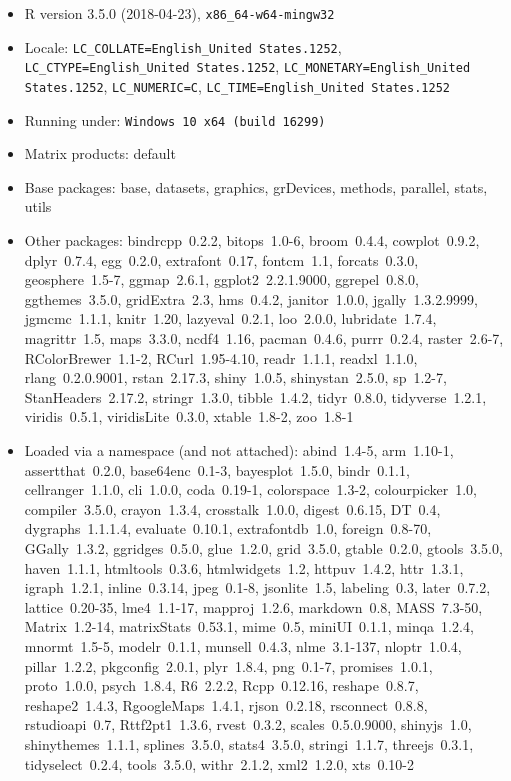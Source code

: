 \documentclass[draft]{agujournal}\usepackage{knitr}
\begin{document}
\begin{itemize}\raggedright
  \item R version 3.5.0 (2018-04-23), \verb|x86_64-w64-mingw32|
  \item Locale: \verb|LC_COLLATE=English_United States.1252|, \verb|LC_CTYPE=English_United States.1252|, \verb|LC_MONETARY=English_United States.1252|, \verb|LC_NUMERIC=C|, \verb|LC_TIME=English_United States.1252|
  \item Running under: \verb|Windows 10 x64 (build 16299)|
  \item Matrix products: default
  \item Base packages: base, datasets, graphics, grDevices,
    methods, parallel, stats, utils
  \item Other packages: bindrcpp~0.2.2, bitops~1.0-6, broom~0.4.4,
    cowplot~0.9.2, dplyr~0.7.4, egg~0.2.0, extrafont~0.17,
    fontcm~1.1, forcats~0.3.0, geosphere~1.5-7, ggmap~2.6.1,
    ggplot2~2.2.1.9000, ggrepel~0.8.0, ggthemes~3.5.0,
    gridExtra~2.3, hms~0.4.2, janitor~1.0.0, jgally~1.3.2.9999,
    jgmcmc~1.1.1, knitr~1.20, lazyeval~0.2.1, loo~2.0.0,
    lubridate~1.7.4, magrittr~1.5, maps~3.3.0, ncdf4~1.16,
    pacman~0.4.6, purrr~0.2.4, raster~2.6-7, RColorBrewer~1.1-2,
    RCurl~1.95-4.10, readr~1.1.1, readxl~1.1.0, rlang~0.2.0.9001,
    rstan~2.17.3, shiny~1.0.5, shinystan~2.5.0, sp~1.2-7,
    StanHeaders~2.17.2, stringr~1.3.0, tibble~1.4.2, tidyr~0.8.0,
    tidyverse~1.2.1, viridis~0.5.1, viridisLite~0.3.0,
    xtable~1.8-2, zoo~1.8-1
  \item Loaded via a namespace (and not attached): abind~1.4-5,
    arm~1.10-1, assertthat~0.2.0, base64enc~0.1-3,
    bayesplot~1.5.0, bindr~0.1.1, cellranger~1.1.0, cli~1.0.0,
    coda~0.19-1, colorspace~1.3-2, colourpicker~1.0,
    compiler~3.5.0, crayon~1.3.4, crosstalk~1.0.0, digest~0.6.15,
    DT~0.4, dygraphs~1.1.1.4, evaluate~0.10.1, extrafontdb~1.0,
    foreign~0.8-70, GGally~1.3.2, ggridges~0.5.0, glue~1.2.0,
    grid~3.5.0, gtable~0.2.0, gtools~3.5.0, haven~1.1.1,
    htmltools~0.3.6, htmlwidgets~1.2, httpuv~1.4.2, httr~1.3.1,
    igraph~1.2.1, inline~0.3.14, jpeg~0.1-8, jsonlite~1.5,
    labeling~0.3, later~0.7.2, lattice~0.20-35, lme4~1.1-17,
    mapproj~1.2.6, markdown~0.8, MASS~7.3-50, Matrix~1.2-14,
    matrixStats~0.53.1, mime~0.5, miniUI~0.1.1, minqa~1.2.4,
    mnormt~1.5-5, modelr~0.1.1, munsell~0.4.3, nlme~3.1-137,
    nloptr~1.0.4, pillar~1.2.2, pkgconfig~2.0.1, plyr~1.8.4,
    png~0.1-7, promises~1.0.1, proto~1.0.0, psych~1.8.4, R6~2.2.2,
    Rcpp~0.12.16, reshape~0.8.7, reshape2~1.4.3,
    RgoogleMaps~1.4.1, rjson~0.2.18, rsconnect~0.8.8,
    rstudioapi~0.7, Rttf2pt1~1.3.6, rvest~0.3.2,
    scales~0.5.0.9000, shinyjs~1.0, shinythemes~1.1.1,
    splines~3.5.0, stats4~3.5.0, stringi~1.1.7, threejs~0.3.1,
    tidyselect~0.2.4, tools~3.5.0, withr~2.1.2, xml2~1.2.0,
    xts~0.10-2
\end{itemize}
\end{document}
